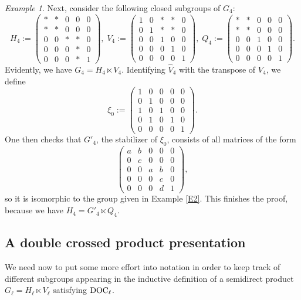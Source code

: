 \documentclass[a4paper,11pt,reqno]{amsart}
\numberwithin{equation}{section}
\theoremstyle{remark}
\newtheorem{example}[theorem]{Example}
\theoremstyle{definition}
\begin{document}
\begin{example}
 Next, consider the following closed subgroups of $G_4$:
 $$
 H_4:= \begin{pmatrix}
 *&*&0&0&0\\
 *&*&0&0&0\\
 0&0&*&* &0\\
 0&0&0&*&0\\
 0&0&0&*&1
 \end{pmatrix}
,\;
 V_4:=\begin{pmatrix}
 1&0&*&*&0\\
 0&1&*&*&0\\
 0&0&1&0&0\\
 0&0&0&1&0\\
 0&0&0&0&1
 \end{pmatrix}
,\;
Q_4:= \begin{pmatrix}
 *&*&0&0&0\\
 *&*&0&0&0\\
 0&0&1&0&0\\
 0&0&0&1&0\\
 0&0&0&0&1
 \end{pmatrix}.
 $$
 Evidently, we have
 $G_4=H_4\ltimes V_4$. Identifying $\hat V_4$ with the transpose of $V_4$, we define
 $$
 \xi_0:=
 \begin{pmatrix}
 1&0&0&0&0\\
 0&1&0&0&0\\
 1&0&1&0&0\\
 0&1&0&1&0\\
 0&0&0&0&1
 \end{pmatrix}.
 $$
One then checks that $G'_4$,  the stabilizer  of $\xi_0$,  consists of all matrices of the form
$$
 \begin{pmatrix}
 a&b&0&0&0\\
 0&c&0&0&0\\
 0&0&a&b&0\\
 0&0&0&c&0\\
 0&0&0&d&1
 \end{pmatrix},
$$
so it is isomorphic to the group given  in Example \ref{E2}.
This finishes the proof, because we have $H_4=G'_4\ltimes Q_4$.
\end{example}




\subsection{A double crossed product presentation}
We need now to put some more effort into notation in order to keep track of different subgroups  appearing in the inductive definition of
a semidirect product $G_\ell=H_\ell\ltimes V_\ell$  satisfying  ${\rm DOC}_\ell$.
\end{document}
